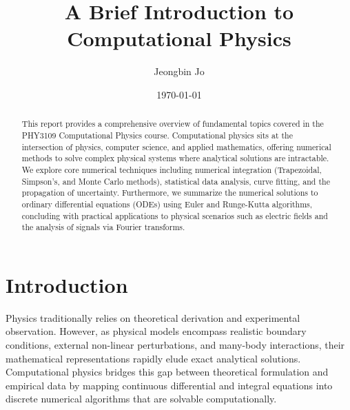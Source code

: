 \documentclass[aps, reprint, twocolumn, superscriptaddress, floatfix]{revtex4-2}
\begin{document}

\title{A Brief Introduction to Computational Physics}

\author{Jeongbin Jo}

\date{\today}

\begin{abstract}
This report provides a comprehensive overview of fundamental topics covered in the PHY3109 Computational Physics course. Computational physics sits at the intersection of physics, computer science, and applied mathematics, offering numerical methods to solve complex physical systems where analytical solutions are intractable. We explore core numerical techniques including numerical integration (Trapezoidal, Simpson's, and Monte Carlo methods), statistical data analysis, curve fitting, and the propagation of uncertainty. Furthermore, we summarize the numerical solutions to ordinary differential equations (ODEs) using Euler and Runge-Kutta algorithms, concluding with practical applications to physical scenarios such as electric fields and the analysis of signals via Fourier transforms.
\end{abstract}

\maketitle
\thispagestyle{fancytitle}
\addwatermark

\onecolumngrid  %
\vspace{-1cm}
\tableofcontents
\vspace{1cm}    %
\twocolumngrid  %

\section{Introduction}

Physics traditionally relies on theoretical derivation and experimental observation. However, as physical models encompass realistic boundary conditions, external non-linear perturbations, and many-body interactions, their mathematical representations rapidly elude exact analytical solutions. Computational physics bridges this gap between theoretical formulation and empirical data by mapping continuous differential and integral equations into discrete numerical algorithms that are solvable computationally. 
\end{document}
